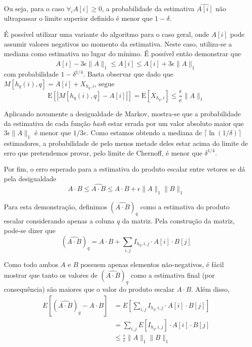 Ou seja, para o caso $\forall_i A[i] \geq 0$, a probabilidade da estimativa $\widehat{A[i]}$ não ultrapassar o limite superior definido é menor que $1 - \delta$.

É possível utilizar uma variante do algoritmo para o caso geral, onde $A[i]$ pode assumir valores negativos no momento da estimativa. Neste caso, utiliza-se a mediana como estimativa no lugar do mínimo. É possível então demonstrar que
\[
A[i] - 3 \epsilon \lVert A \rVert_1 \leq \widehat{A[i]} \leq A[i] + 3 \epsilon \lVert A \rVert_1
\]
com probabilidade $1 - \delta^{1/4}$. Basta observar que dado que $M[h_q(i), q] = A[i] + X_{h_q, i}$, segue
\[
\text{E}\left[ |M[h_q(i), q] - A[i]| \right] = \text{E}[X_{h_q,i}] \leq \frac{\epsilon}{e} \lVert A \rVert_1
\]

Aplicando novamente a desigualdade de Markov, mostra-se que a probabilidade da estimativa de cada função \emph{hash} estar errada por um valor absoluto maior que $3\epsilon \lVert A \rVert_1$ é menor que $1/3e$. Como estamos obtendo a mediana de $\lceil \ln(1/\delta) \rceil$ estimadores, a probabilidade de pelo menos metade deles estar acima do limite de erro que pretendemos provar, pelo limite de Chernoff, é menor que $\delta^{1/4}$.

Por fim, o erro esperado para a estimativa do produto escalar entre vetores se dá pela desigualdade
\[
    A \cdot B \leq \widehat{A \cdot B} \leq A \cdot B + \epsilon \lVert A \rVert_1 \lVert B \rVert_1
\]

Para esta demonstração, definimos $(\widehat{A \cdot B})_q$ como a estimativa do produto escalar considerando apenas a coluna $q$ da matriz. Pela construção da matriz, pode-se dizer que
\[
    (\widehat{A \cdot B})_q = A \cdot B + \sum_{i,j} I_{h_q,i,j} \cdot A[i] \cdot B[j] 
\]

Como todo ambos $A$ e $B$ possuem apenas elementos não-negativos, é fácil mostrar que tanto os valores de $(\widehat{A \cdot B})_q$ como a estimativa final (por consequência) são maiores que o valor do produto escalar $A\cdot B$. Além disso,
\begin{align*}
    E\left[ (\widehat{A \cdot B})_q - A \cdot B \right] 
    &= E\left[ \sum_{i,j} I_{h_q,i,j} \cdot A[i] \cdot B[j]  \right] \\
    &= \sum_{i,j} E\left[ I_{h_q,i,j} \right] \cdot A[i] \cdot B[j] \\
    &\leq \frac{\epsilon}{e}   \lVert A \rVert_1 \lVert B \rVert_1
\end{align*}

